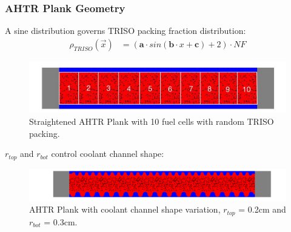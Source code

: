 \begin{frame}
    \frametitle{AHTR Plank Geometry}
    A sine distribution governs TRISO packing fraction distribution: 
    \begin{align}
        \rho_{TRISO}(\vec{x}) &= \left(\textbf{a}\cdot sin(\textbf{b}\cdot x + \textbf{c}) + 2\right) \cdot NF \nonumber
    \end{align}
    \begin{figure}
        \includegraphics[width=0.9\linewidth]{../docs/figures/straightened_plank.png} 
        \caption{Straightened AHTR Plank with 10 fuel cells with random TRISO packing.}
    \end{figure}
    $r_{top}$ and $r_{bot}$ control coolant channel shape: 
    \begin{figure}
        \includegraphics[width=\linewidth]{../docs/figures/coolant-channel-shape.png} 
        \caption{AHTR Plank with coolant channel shape variation, $r_{top}$ = 0.2cm and 
        $r_{bot}$ = 0.3cm.}
    \end{figure}
\end{frame}